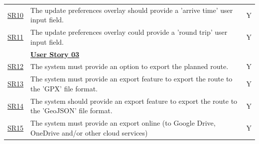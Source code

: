 \begin{table}[!htb]
\begin{tabularx}{\textwidth}{ p{1cm} p{11cm} p{1cm} }
        \hyperref[SR:10]{SR10} & The update preferences overlay should provide a 'arrive time' user input field. & Y\\ 
        \hyperref[SR:11]{SR11} & The update preferences overlay could provide a 'round trip' user input field. & Y\\ 
        \hline
        & \textbf{\hyperref[tab:user-story-03]{User Story 03}}  \\
        \hyperref[SR:12]{SR12} & The system must provide an option to export the planned route. & Y \\
        \hyperref[SR:13]{SR13} & The system must provide an export feature to export the route to the 'GPX' file format. & Y\\
        \hyperref[SR:14]{SR14} & The system should provide an export feature to export the route to the 'GeoJSON' file format. & Y\\ 
        \hyperref[SR:15]{SR15} & The system must provide an export online (to Google Drive, OneDrive and/or other cloud services) & Y\\
        \hline
    \end{tabularx}
\end{table}
\clearpage

